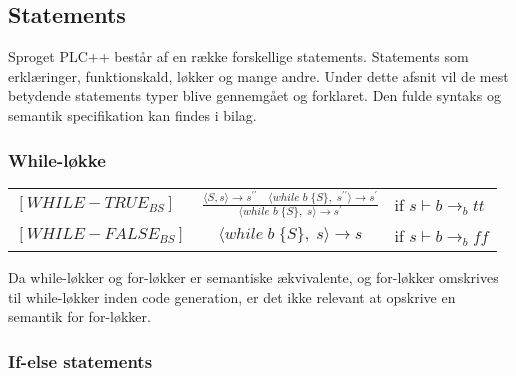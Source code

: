 \noindent \subsection{Statements}
Sproget PLC++ består af en række forskellige statements. Statements som erklæringer, funktionskald, løkker og mange andre. Under dette afsnit vil de mest betydende statements typer blive gennemgået og forklaret. Den fulde syntaks og semantik specifikation kan findes i bilag.





\noindent \subsubsection{While-løkke}

    \begin{semantik}
    \bgroup
    \def\arraystretch{3}
    \begin{table}[H]
    \centering
    \begin{tabular}{l c l}
        
        $[WHILE-TRUE_{BS}]$ & $
        \frac{\langle S, s\rangle  \rightarrow s^{\prime\prime} \quad \langle while\;b\;\{ S\},\;s^{\prime\prime}\rangle  \rightarrow s^{\prime}}
        {\langle while\;b\;\{ S\},\;s\rangle  \rightarrow s^{\prime}}
        $ & if $s \vdash b \rightarrow_b tt$ \\
        
        $[WHILE-FALSE_{BS}]$ & $
        \langle while\;b\;\{S\},\;s\rangle  \rightarrow s$ & 
        if $s \vdash b \rightarrow_b ff$ \\

    \end{tabular}
    \end{table}
    \egroup
    \caption{While-løkke}
    \label{sem:while}
    \end{semantik}
    
Da while-løkker og for-løkker er semantiske ækvivalente, og for-løkker omskrives til while-løkker inden code generation, er det ikke relevant at opskrive en semantik for for-løkker.

\noindent \subsubsection{If-else statements}

